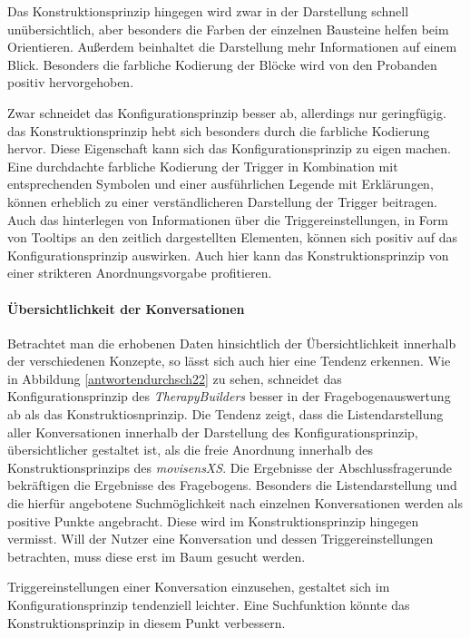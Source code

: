 Das Konstruktionsprinzip hingegen wird zwar in der Darstellung schnell unübersichtlich, aber besonders die Farben der einzelnen Bausteine helfen beim Orientieren. Außerdem beinhaltet die Darstellung mehr Informationen auf einem Blick. Besonders die farbliche Kodierung der Blöcke wird von den Probanden positiv hervorgehoben. 

Zwar schneidet das Konfigurationsprinzip besser ab, allerdings nur geringfügig. das Konstruktionsprinzip hebt sich besonders durch die farbliche Kodierung hervor. Diese Eigenschaft kann sich das Konfigurationsprinzip zu eigen machen. Eine durchdachte farbliche Kodierung der Trigger in Kombination mit entsprechenden Symbolen und einer ausführlichen Legende mit Erklärungen, können erheblich zu einer verständlicheren Darstellung der Trigger beitragen. Auch das hinterlegen von Informationen über die Triggereinstellungen, in Form von Tooltips an den zeitlich dargestellten Elementen, können sich positiv auf das Konfigurationsprinzip auswirken. Auch hier kann das Konstruktionsprinzip von einer strikteren Anordnungsvorgabe profitieren. 

\paragraph{Übersichtlichkeit der Konversationen}
Betrachtet man die erhobenen Daten hinsichtlich der Übersichtlichkeit innerhalb der verschiedenen Konzepte, so lässt sich auch hier eine Tendenz erkennen. Wie in Abbildung \ref{antwortendurchsch22} zu sehen, schneidet das Konfigurationsprinzip des \emph{TherapyBuilders} besser in der Fragebogenauswertung ab als das Konstruktiosnprinzip. Die Tendenz zeigt, dass die Listendarstellung aller Konversationen innerhalb der Darstellung des Konfigurationsprinzip, übersichtlicher gestaltet ist, als die freie Anordnung innerhalb des Konstruktionsprinzips des \emph{movisensXS}. Die Ergebnisse der Abschlussfragerunde bekräftigen die Ergebnisse des Fragebogens. Besonders die Listendarstellung und die hierfür angebotene Suchmöglichkeit nach einzelnen Konversationen werden als positive Punkte angebracht. Diese wird im Konstruktionsprinzip hingegen vermisst. Will der Nutzer eine Konversation und dessen Triggereinstellungen betrachten, muss diese erst im Baum gesucht werden. 

Triggereinstellungen einer Konversation einzusehen, gestaltet sich im Konfigurationsprinzip tendenziell leichter. Eine Suchfunktion könnte das Konstruktionsprinzip in diesem Punkt verbessern.


